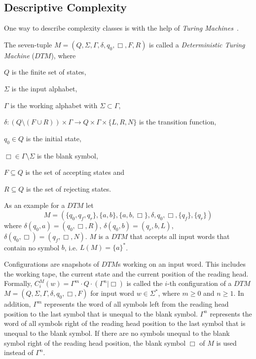 
\subsection{Descriptive Complexity}\label{subsec:descriptiveComplexity}

One way to describe complexity classes is with the help of \textit{Turing Machines}~\cite{hopcroft1994einfuehrung}.

\begin{definition}
    The seven-tuple $M = (Q, \Sigma, \Gamma, \delta, q_0, \Box, F, R)$ is called a \emph{Deterministic Turing Machine}
    ($\mathit{DTM}$),
    where
    \begin{compactitem}
        \item $Q$ is the finite set of states,
        \item $\Sigma$ is the input alphabet,
        \item $\Gamma$ is the working alphabet with $\Sigma \subset \Gamma$,
        \item $\delta : (Q \setminus (F \cup R)) \times \Gamma \rightarrow Q \times \Gamma \times \{L, R, N\}$ is the
        transition function,
        \item $q_0 \in Q$ is the initial state,
        \item $\Box \in \Gamma \setminus \Sigma$ is the blank symbol,
        \item $F \subseteq Q$ is the set of accepting states and
        \item $R \subseteq Q$ is the set of rejecting states.
    \end{compactitem}
\end{definition}

\begin{example}
    \label{example:dtm}
    As an example for a $\mathit{DTM}$ let
    \[M = (\{q_0, q_f, q_r\}, \{a, b\}, \{a, b, \Box\}, \delta, q_0, \Box, \{q_f\}, \{q_r\})\]
    where $\delta(q_0, a)= (q_0, \Box, R)$, $\delta(q_0, b) = (q_r, b, L)$, $\delta(q_0, \Box) = (q_f, \Box, N)$.
    $M$ is a $\mathit{DTM}$ that accepts all input words that contain no symbol $b$, i.e. $L(M) = \{a\}^*$.
\end{example}

Configurations are snapshots of $\mathit{DTM}$s working on an input word. This includes the working tape, the current
state and the current position of the reading head. Formally, $C_i^M(w) = \Gamma^m \cdot Q \cdot (\Gamma^n | \Box)$
is called the $i$-th configuration of a $\mathit{DTM}$ $M = (Q, \Sigma, \Gamma, \delta, q_0, \Box, F)$ for input word
$w \in \Sigma^*$, where $m \geq 0$ and $n \geq 1$. In addition, $\Gamma^m$ represents the word of all symbols left
from the reading head position to the last symbol that is unequal to the blank symbol. $\Gamma^n$ represents the word
of all symbols right of the reading head position to the last symbol that is unequal to the blank symbol. If there
are no symbols unequal to the blank symbol right of the reading head position, the blank symbol $\Box$ of $M$ is used
instead of $\Gamma^n$.

